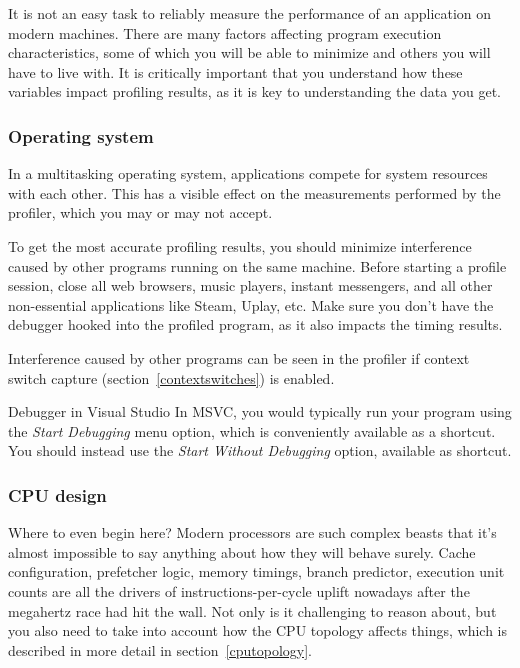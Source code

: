 \documentclass[hidelinks,titlepage,a4paper,twoside]{article}
\begin{document}
It is not an easy task to reliably measure the performance of an application on modern machines. There are many factors affecting program execution characteristics, some of which you will be able to minimize and others you will have to live with. It is critically important that you understand how these variables impact profiling results, as it is key to understanding the data you get.

\subsubsection{Operating system}
\label{checkenvironmentos}

In a multitasking operating system, applications compete for system resources with each other. This has a visible effect on the measurements performed by the profiler, which you may or may not accept.

To get the most accurate profiling results, you should minimize interference caused by other programs running on the same machine. Before starting a profile session, close all web browsers, music players, instant messengers, and all other non-essential applications like Steam, Uplay, etc. Make sure you don't have the debugger hooked into the profiled program, as it also impacts the timing results.

Interference caused by other programs can be seen in the profiler if context switch capture (section~\ref{contextswitches}) is enabled.

\begin{bclogo}[
noborder=true,
couleur=black!5,
logo=\bclampe
]{Debugger in Visual Studio}
In MSVC, you would typically run your program using the \emph{Start Debugging} menu option, which is conveniently available as a  shortcut. You should instead use the \emph{Start Without Debugging} option, available as  shortcut.
\end{bclogo}

\subsubsection{CPU design}
\label{checkenvironmentcpu}

Where to even begin here? Modern processors are such complex beasts that it's almost impossible to say anything about how they will behave surely. Cache configuration, prefetcher logic, memory timings, branch predictor, execution unit counts are all the drivers of instructions-per-cycle uplift nowadays after the megahertz race had hit the wall. Not only is it challenging to reason about, but you also need to take into account how the CPU topology affects things, which is described in more detail in section~\ref{cputopology}.
\end{document}
